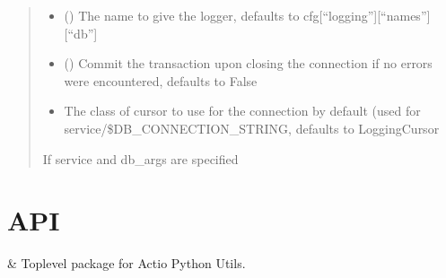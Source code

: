 \documentclass[letterpaper,10pt,english]{sphinxmanual}
\begin{document}
\begin{fulllineitems}
\begin{quote}
\begin{description}
\begin{itemize}
\item {} 
\sphinxAtStartPar
{} () \textendash{} The name to give the logger, defaults to
cfg{[}“logging”{]}{[}“names”{]}{[}“db”{]}

\item {} 
\sphinxAtStartPar
{} () \textendash{} Commit the transaction upon closing the connection if no
errors were encountered, defaults to False

\item {} 
\sphinxAtStartPar
{} \textendash{} The class of cursor to use for the
connection by default (used for service/\$DB\_CONNECTION\_STRING, defaults
to LoggingCursor

\end{itemize}

\sphinxAtStartPar
{} \textendash{} If service and db\_args are specified

\end{description}\end{quote}

\end{fulllineitems}


\sphinxstepscope


\chapter{API}
\label{\detokenize{api:api}}\label{\detokenize{api::doc}}

\begin{savenotes}\sphinxattablestart
\sphinxthistablewithglobalstyle
\sphinxthistablewithnovlinesstyle
\centering
\begin{tabulary}{\linewidth}[t]{}
\sphinxtoprule
\sphinxtableatstartofbodyhook
\sphinxAtStartPar
{\hyperref[\detokenize{_autosummary/actio_python_utils:module-actio_python_utils}]{}}
&
\sphinxAtStartPar
Top\sphinxhyphen{}level package for Actio Python Utils.
\\
\sphinxbottomrule
\end{tabulary}
\sphinxtableafterendhook\par
\sphinxattableend\end{savenotes}
\end{document}
